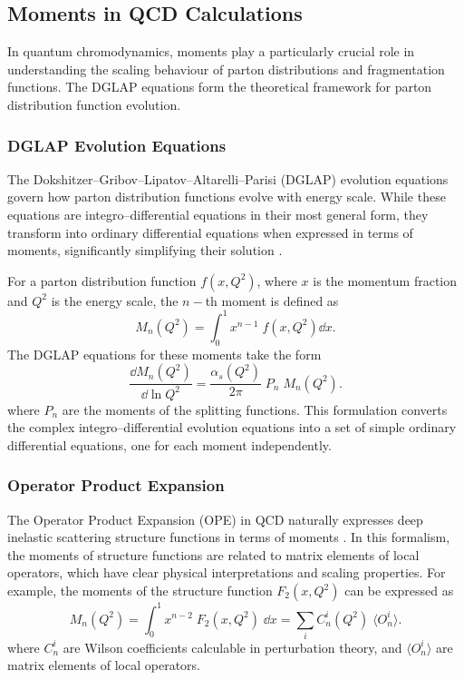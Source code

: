     \subsection{Moments in QCD Calculations}
        In quantum chromodynamics, moments play a particularly crucial role in understanding the scaling behaviour of parton distributions and fragmentation functions.
        The DGLAP equations form the theoretical framework for parton distribution function evolution. 
        \subsubsection{DGLAP Evolution Equations}
            The Dokshitzer--Gribov--Lipatov--Altarelli--Parisi (DGLAP) evolution equations govern how parton distribution functions evolve with energy scale.
            While these equations are integro--differential equations in their most general form, they transform into ordinary differential equations when expressed in terms of moments, significantly simplifying their solution .

            For a parton distribution function $f(x,Q^2)$, where $x$ is the momentum fraction and $Q^2$ is the energy scale, the $n-$th moment is defined as
            \[
                M_n(Q^2) = \int_0^1 x^{n-1}\;f(x,Q^2) \dd x.
            \]
            The DGLAP equations for these moments take the form
            \[
            \frac{\dd M_n(Q^2)}{\dd \ln Q^2} = \frac{\alpha_s(Q^2)}{2\pi}\; P_n\;M_n(Q^2).
            \]
            where $P_n$ are the moments of the splitting functions.
            This formulation converts the complex integro--differential evolution equations into a set of simple ordinary differential equations, one for each moment independently.

        \subsubsection{Operator Product Expansion}
            The Operator Product Expansion (OPE) in QCD naturally expresses deep inelastic scattering structure functions in terms of moments .
            In this formalism, the moments of structure functions are related to matrix elements of local operators, which have clear physical interpretations and scaling properties.
            For example, the moments of the structure function $F_2(x,Q^2)$ can be expressed as
            \[
                M_n(Q^2) = \int_0^1 x^{n-2}\;F_2(x,Q^2)\;\dd x = \sum_i C_n^i(Q^2) \;\langle O_n^i \rangle.
            \]
            where $C_n^i$ are Wilson coefficients calculable in perturbation theory, and $\langle O_n^i \rangle$ are matrix elements of local operators.
